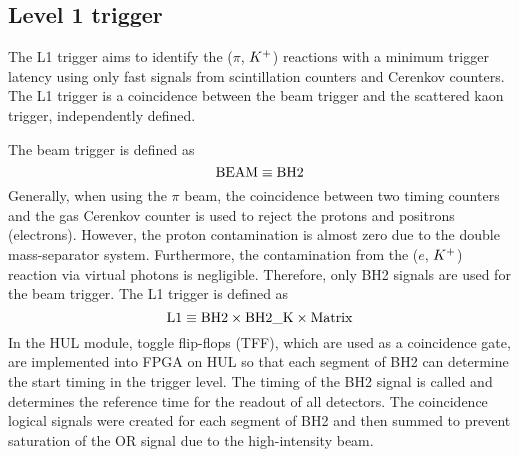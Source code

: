 \subsection{Level 1 trigger}
The L1 trigger aims to identify the ($\pi$, $K^{+}$) reactions with a minimum trigger latency using only fast signals from scintillation counters and Cerenkov counters. The L1 trigger is a coincidence between the beam trigger and the scattered kaon trigger, independently defined. 

The beam trigger is defined as 
\begin{equation}
  {\rm BEAM \equiv BH2}
\end{equation}
Generally, when using the $\pi$ beam, the coincidence between two timing counters and the gas Cerenkov counter is used to reject the protons and positrons (electrons). However, the proton contamination is almost zero due to the double mass-separator system. Furthermore, the contamination from the ($e$, $K^{+}$) reaction via virtual photons is negligible. Therefore, only BH2 signals are used for the beam trigger. The L1 trigger is defined as
\begin{equation}
  {\rm L1 \equiv BH2\times BH2\_K \times Matrix }
\end{equation}
In the HUL module, toggle flip-flops (TFF), which are used as a coincidence gate, are implemented into FPGA on HUL so that each segment of BH2 can determine the start timing in the trigger level. The timing of the BH2 signal is called  and determines the reference time for the readout of all detectors. The coincidence logical signals were created for each segment of BH2 and then summed to prevent saturation of the OR signal due to the high-intensity beam.


